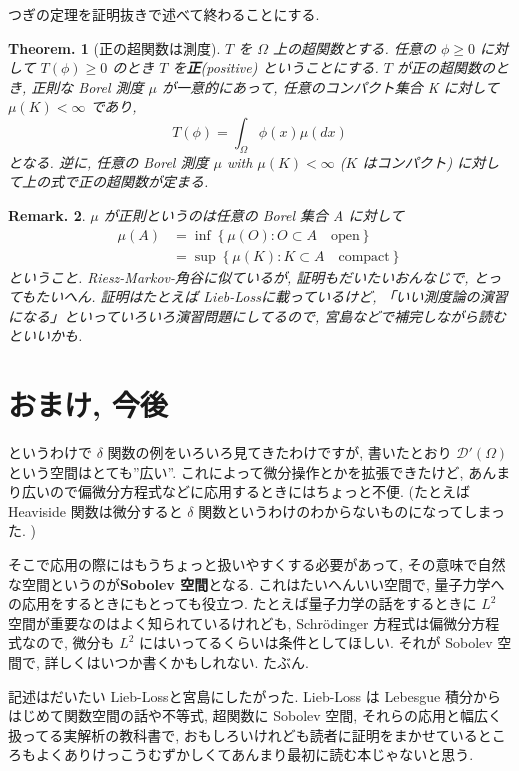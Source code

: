 \documentclass[openany, a4paper, oneside]{book}
\theoremstyle{break}
\newtheorem{thm}{Theorem.}[section]
\theoremstyle{breakdefn}
\newtheorem{rem}[thm]{Remark.}
\newcommand{\set}[2]{\left\{#1 : #2\right\}}
\begin{document}
つぎの定理を証明抜きで述べて終わることにする.
\begin{thm}[正の超関数は測度]
 $T$ を $\Omega$ 上の超関数とする.
 任意の $\phi \ge 0$ に対して $T (\phi) \ge 0$ のとき $T$ を\textbf{正}(positive) ということにする.
 $T$ が正の超関数のとき, 正則な Borel 測度 $\mu$ が一意的にあって,
 任意のコンパクト集合 K に対して $\mu (K) < \infty$ であり,
 \begin{equation}
  T (\phi) = \int_{\Omega}\phi (x)\mu (dx)
 \end{equation}
 となる.
 逆に, 任意の Borel 測度 $\mu$  with  $\mu (K) < \infty$ ($K$ はコンパクト) に対して上の式で正の超関数が定まる.
\end{thm}
\begin{rem}
 $\mu$ が正則というのは任意の Borel 集合 A に対して
 \begin{align}
  \mu (A)
  &=
  \inf \set{\mu (O)}{O \subset A \quad \text{open}} \\
  &=
  \sup \set{\mu (K)}{K \subset A \quad \text{compact}}
 \end{align}
 ということ.
 Riesz-Markov-角谷に似ているが, 証明もだいたいおんなじで, とってもたいへん.
 証明はたとえば Lieb-Loss\cite{LiebLoss1}に載っているけど,
 「いい測度論の演習になる」といっていろいろ演習問題にしてるので,
 宮島\cite{ShizuoMiyajima2}などで補完しながら読むといいかも.
\end{rem}
\section{おまけ, 今後}
\label{sec-7-12-5}

というわけで $\delta$ 関数の例をいろいろ見てきたわけですが,
書いたとおり $\mathcal{D}'(\Omega)$ という空間はとても''広い''.
これによって微分操作とかを拡張できたけど, あんまり広いので偏微分方程式などに応用するときにはちょっと不便.
(たとえば Heaviside 関数は微分すると $\delta$ 関数というわけのわからないものになってしまった. )

そこで応用の際にはもうちょっと扱いやすくする必要があって,
その意味で自然な空間というのが\textbf{Sobolev 空間}となる.
これはたいへんいい空間で, 量子力学への応用をするときにもとっても役立つ.
たとえば量子力学の話をするときに $L^2$ 空間が重要なのはよく知られているけれども,
Schr\"odinger 方程式は偏微分方程式なので,
微分も $L^2$ にはいってるくらいは条件としてほしい.
それが Sobolev 空間で, 詳しくはいつか書くかもしれない.
たぶん.

記述はだいたい Lieb-Loss\cite{LiebLoss1}と宮島\cite{ShizuoMiyajima1}にしたがった.
Lieb-Loss は Lebesgue 積分からはじめて関数空間の話や不等式,
超関数に Sobolev 空間, それらの応用と幅広く扱ってる実解析の教科書で,
おもしろいけれども読者に証明をまかせているところもよくありけっこうむずかしくてあんまり最初に読む本じゃないと思う.
\end{document}
